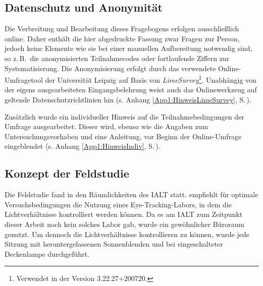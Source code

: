 
\subsection{Datenschutz und Anonymität} 
\label{K5:subsec:Anonymitaet}


Die Verbreitung und Bearbeitung dieses Fragebogens erfolgen ausschließlich online. Daher enthält die hier abgedruckte Fassung zwar Fragen zur Person, jedoch keine Elemente wie sie bei einer manuellen Aufbereitung notwendig sind, so z.\,B.\ die anonymisierten Teilnahmecodes oder fortlaufende Ziffern zur Systematisierung. Die Anonymisierung erfolgt durch das verwendete Online-Umfragetool der Universität Leipzig auf Basis von \emph{LimeSurvey}\footnote{Verwendet in der Version 3.22.27+200720.}. Unabhängig von der eigens ausgearbeiteten Eingangsbelehrung weist auch das Onlinewerkzeug auf geltende Datenschutzrichtlinien hin (s. Anhang \ref{App1:HinweisLimeSurvey}, S.\,\pageref{App1:HinweisLimeSurvey}).

Zusätzlich wurde ein individueller Hinweis auf die Teilnahmebedingungen der Umfrage ausgearbeitet. Dieser wird, ebenso wie die Angaben zum Untersuchungsvorhaben und eine Anleitung, vor Beginn der Online-Umfrage eingeblendet (s. Anhang \ref{App1:HinweisIndiv}, S.\,\pageref{App1:HinweisIndiv}).


\subsection{Konzept der Feldstudie}
\label{K5:subsec:Konzept-Feldstudie}


Die Feldstudie fand in den Räumlichkeiten des IALT statt. \citet[263]{obrien_eye_2009} empfiehlt für optimale Versuchsbedingungen die Nutzung eines Eye-Tracking-Labors, in dem die Lichtverhältnisse kontrolliert werden können. Da es am IALT zum Zeitpunkt dieser Arbeit noch kein solches Labor gab, wurde ein gewöhnlicher Büroraum genutzt. Um dennoch die Lichtverhältnisse kontrollieren zu können, wurde jede Sitzung mit heruntergelassenen Sonnenblenden und bei eingeschalteter Deckenlampe durchgeführt.

